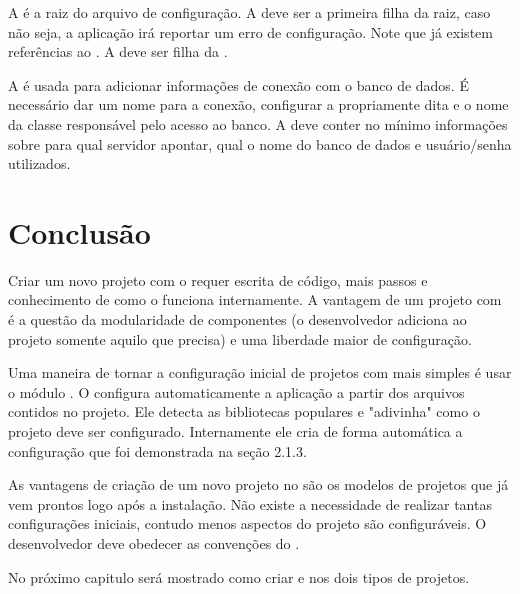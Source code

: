 A   é a raiz do arquivo de configuração. A   deve ser a primeira filha da  raiz, caso não seja, a aplicação irá reportar um erro de configuração. Note que já existem referências ao . A   deve ser filha da  .

A   é usada para adicionar informações de conexão com o banco de dados. É necessário dar um nome para a conexão, configurar a  propriamente dita e o nome da classe responsável pelo acesso ao banco. A  deve conter no mínimo informações sobre para qual servidor apontar, qual o nome do banco de dados e usuário/senha utilizados. 

\section{Conclusão}

Criar um novo projeto com o  requer escrita de código, mais passos e conhecimento de como o  funciona internamente. A vantagem de um projeto com  é a questão da modularidade de componentes (o desenvolvedor adiciona ao projeto somente aquilo que precisa) e uma liberdade maior de configuração.

Uma maneira de tornar a configuração inicial de projetos  com  mais simples é usar o módulo . O  configura automaticamente a aplicação a partir dos arquivos  contidos no projeto. Ele detecta as bibliotecas populares e "adivinha" como o projeto deve ser configurado. Internamente ele cria de forma automática a configuração que foi demonstrada na seção 2.1.3.

As vantagens de criação de um novo projeto  no  são os modelos de projetos que já vem prontos logo após a instalação. Não existe a necessidade de realizar tantas configurações iniciais, contudo menos aspectos do projeto são configuráveis. O desenvolvedor deve obedecer as convenções do .

No próximo capitulo será mostrado como criar  e  nos dois tipos de projetos.